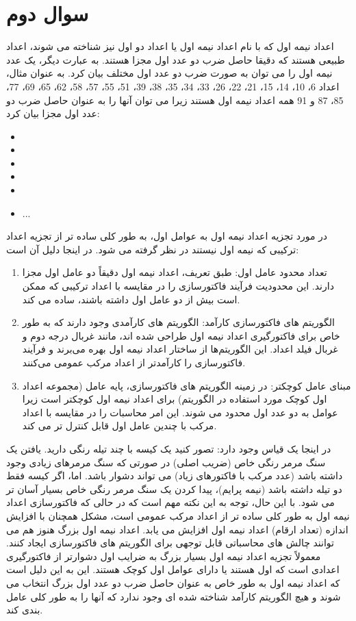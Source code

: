 \documentclass{report}
\begin{document}
\section{سوال دوم}

اعداد نیمه اول که با نام اعداد نیمه اول یا اعداد دو اول نیز شناخته می شوند، اعداد طبیعی هستند که دقیقا حاصل ضرب دو عدد اول مجزا هستند. به عبارت دیگر، یک عدد نیمه اول را می توان به صورت ضرب دو عدد اول مختلف بیان کرد.
به عنوان مثال، اعداد 6، 10، 14، 15، 21، 22، 26، 33، 34، 35، 38، 39، 51، 55، 57، 58، 62، 65، 69، 77، 85، 87 و 91 همه اعداد نیمه اول هستند زیرا می توان آنها را به عنوان حاصل ضرب دو عدد اول مجزا بیان کرد:
\begin{itemize}
    \item {}
    \item {}
    \item {}
    \item {}
    \item {}
    \item ...
\end{itemize}
در مورد تجزیه اعداد نیمه اول به عوامل اول، به طور کلی ساده تر از تجزیه اعداد ترکیبی که نیمه اول نیستند در نظر گرفته می شود.
در اینجا دلیل آن است:
\begin{enumerate}
    \item تعداد محدود عامل اول: طبق تعریف، اعداد نیمه اول دقیقاً دو عامل اول مجزا دارند. این محدودیت فرآیند فاکتورسازی را در مقایسه با اعداد ترکیبی که ممکن است بیش از دو عامل اول داشته باشند، ساده می کند.
    \item الگوریتم های فاکتورسازی کارآمد: الگوریتم های کارآمدی وجود دارند که به طور خاص برای فاکتورگیری اعداد نیمه اول طراحی شده اند، مانند غربال درجه دوم و غربال فیلد اعداد. این الگوریتم‌ها از ساختار اعداد نیمه اول بهره می‌برند و فرآیند فاکتورسازی را کارآمدتر از اعداد مرکب عمومی می‌کنند.
    \item مبنای عامل کوچکتر: در زمینه الگوریتم های فاکتورسازی، پایه عامل (مجموعه اعداد اول کوچک مورد استفاده در الگوریتم) برای اعداد نیمه اول کوچکتر است زیرا عوامل به دو عدد اول محدود می شوند. این امر محاسبات را در مقایسه با اعداد مرکب با چندین عامل اول قابل کنترل تر می کند.
\end{enumerate}
در اینجا یک قیاس وجود دارد: تصور کنید یک کیسه با چند تیله رنگی دارید. یافتن یک سنگ مرمر رنگی خاص (ضریب اصلی) در صورتی که سنگ مرمرهای زیادی وجود داشته باشد (عدد مرکب با فاکتورهای زیاد) می تواند دشوار باشد. اما، اگر کیسه فقط دو تیله داشته باشد (نیمه پرایم)، پیدا کردن یک سنگ مرمر رنگی خاص بسیار آسان تر می شود.
با این حال، توجه به این نکته مهم است که در حالی که فاکتورسازی اعداد نیمه اول به طور کلی ساده تر از اعداد مرکب عمومی است، مشکل همچنان با افزایش اندازه (تعداد ارقام) اعداد نیمه اول افزایش می یابد. اعداد نیمه اول بزرگ هنوز هم می توانند چالش های محاسباتی قابل توجهی برای الگوریتم های فاکتورسازی ایجاد کنند.
معمولاً تجزیه اعداد نیمه اول بسیار بزرگ به ضرایب اول دشوارتر از فاکتورگیری اعدادی است که اول هستند یا دارای عوامل اول کوچک هستند. این به این دلیل است که اعداد نیمه اول به طور خاص به عنوان حاصل ضرب دو عدد اول بزرگ انتخاب می شوند و هیچ الگوریتم کارآمد شناخته شده ای وجود ندارد که آنها را به طور کلی عامل بندی کند.
\end{document}

